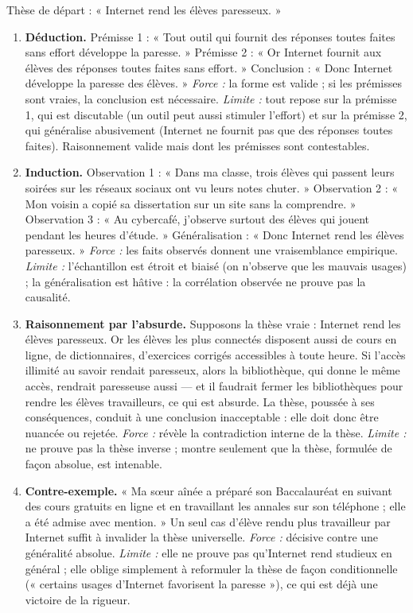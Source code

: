 \documentclass[11pt]{article}
\begin{document}
\begin{corrige}
\begin{enumerate}
\end{enumerate}
\end{corrige}

\begin{corrige}
Thèse de départ : « Internet rend les élèves paresseux. »

\begin{enumerate}
\item \textbf{Déduction.} Prémisse 1 : « Tout outil qui fournit des réponses toutes faites sans effort développe la paresse. » Prémisse 2 : « Or Internet fournit aux élèves des réponses toutes faites sans effort. » Conclusion : « Donc Internet développe la paresse des élèves. » \emph{Force :} la forme est valide ; si les prémisses sont vraies, la conclusion est nécessaire. \emph{Limite :} tout repose sur la prémisse 1, qui est discutable (un outil peut aussi stimuler l'effort) et sur la prémisse 2, qui généralise abusivement (Internet ne fournit pas que des réponses toutes faites). Raisonnement valide mais dont les prémisses sont contestables.
\item \textbf{Induction.} Observation 1 : « Dans ma classe, trois élèves qui passent leurs soirées sur les réseaux sociaux ont vu leurs notes chuter. » Observation 2 : « Mon voisin a copié sa dissertation sur un site sans la comprendre. » Observation 3 : « Au cybercafé, j'observe surtout des élèves qui jouent pendant les heures d'étude. » Généralisation : « Donc Internet rend les élèves paresseux. » \emph{Force :} les faits observés donnent une vraisemblance empirique. \emph{Limite :} l'échantillon est étroit et biaisé (on n'observe que les mauvais usages) ; la généralisation est hâtive : la corrélation observée ne prouve pas la causalité.
\item \textbf{Raisonnement par l'absurde.} Supposons la thèse vraie : Internet rend les élèves paresseux. Or les élèves les plus connectés disposent aussi de cours en ligne, de dictionnaires, d'exercices corrigés accessibles à toute heure. Si l'accès illimité au savoir rendait paresseux, alors la bibliothèque, qui donne le même accès, rendrait paresseuse aussi --- et il faudrait fermer les bibliothèques pour rendre les élèves travailleurs, ce qui est absurde. La thèse, poussée à ses conséquences, conduit à une conclusion inacceptable : elle doit donc être nuancée ou rejetée. \emph{Force :} révèle la contradiction interne de la thèse. \emph{Limite :} ne prouve pas la thèse inverse ; montre seulement que la thèse, formulée de façon absolue, est intenable.
\item \textbf{Contre-exemple.} « Ma sœur aînée a préparé son Baccalauréat en suivant des cours gratuits en ligne et en travaillant les annales sur son téléphone ; elle a été admise avec mention. » Un seul cas d'élève rendu plus travailleur par Internet suffit à invalider la thèse universelle. \emph{Force :} décisive contre une généralité absolue. \emph{Limite :} elle ne prouve pas qu'Internet rend studieux en général ; elle oblige simplement à reformuler la thèse de façon conditionnelle (« certains usages d'Internet favorisent la paresse »), ce qui est déjà une victoire de la rigueur.

\end{enumerate}
\end{corrige}
\end{document}
